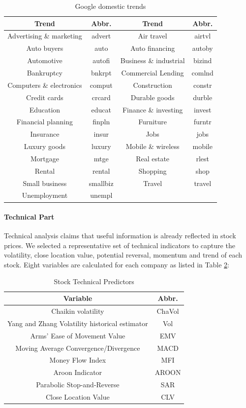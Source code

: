 \documentclass[twoside,11pt]{article}
\begin{document}
\begin{table}[h!]
	\centering
	\begin{tabular}{||c c c c||}
		\hline
		Trend & Abbr. & Trend & Abbr. \\ [0.5ex]
		\hline\hline
		Advertising \& marketing & advert & Air travel & airtvl\\
		Auto buyers & auto & Auto financing & autoby \\
	    Automotive & autofi & Business \& industrial & bizind \\
		Bankruptcy & bnkrpt & Commercial Lending & comlnd \\
		Computers \& electronics & comput & Construction & constr \\
		Credit cards & crcard & Durable goods & durble \\
		Education & educat & Finance \& investing  & invest \\
		Financial planning & finpln & Furniture  & furntr\\
		Insurance & insur & Jobs  & jobs\\
		Luxury goods & luxury & Mobile \& wireless  & mobile\\
		Mortgage & mtge & Real estate  & rlest\\
		Rental & rental & Shopping  & shop\\
		Small business & smallbiz & Travel  &  travel\\
		Unemployment & unempl & &\\ [1ex]
		\hline
	\end{tabular}
	\caption{Google domestic trends}
	\label{table:domestic_trends}
\end{table}


\paragraph{Technical Part}
Technical analysis claims that useful information is already reflected in stock prices. We selected a representative set of technical indicators to capture the volatility, close location value, potential reversal, momentum and trend of each stock. Eight variables are calculated for each company as listed in Table \ref{table:eight_variables}:
\begin{table}[h!]
	\centering
	\begin{tabular}{||c c||}
		\hline
		Variable & Abbr.   \\ [0.5ex]
		\hline\hline
		Chaikin volatility & ChaVol  \\
		Yang and Zhang Volatility historical estimator& Vol \\
		Arms' Ease of Movement Value & EMV \\
		Moving Average Convergence/Divergence & MACD \\
	    Money Flow Index & MFI  \\
		Aroon Indicator & AROON \\
		Parabolic Stop-and-Reverse & SAR \\
		Close Location Value & CLV \\[1ex]
		\hline
	\end{tabular}
	\caption{Stock Technical Predictors}
	\label{table:eight_variables}
\end{table}
\end{document}
